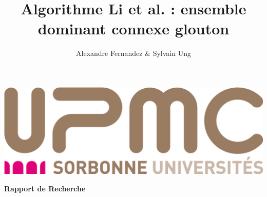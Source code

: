 \title{Algorithme Li et al. : ensemble dominant connexe glouton}
\author{Alexandre Fernandez \& Sylvain Ung}
\maketitle
\thispagestyle{empty}

\hrulefill
\vspace*{1cm}
\begin{center}
\includegraphics[scale=0.15]{images/logo_upmc.jpg}%
\end{center}
\vspace*{1cm}
\hrulefill

\begin{center}\bfseries\Huge
  Rapport de Recherche
\end{center}